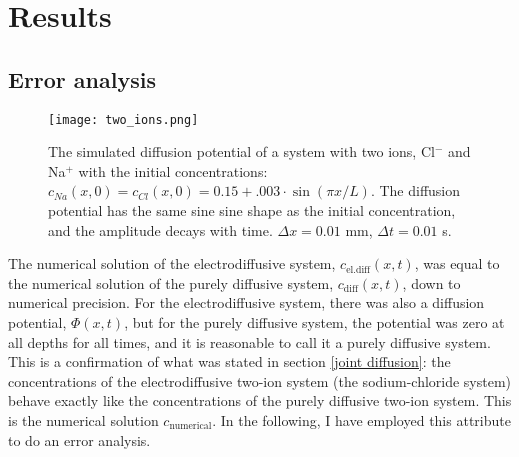 \documentclass{article}
\begin{document}
\section{Results}
\subsection{Error analysis}\label{numerical vs analytical}

\begin{figure}
  \texttt{[image: two\_ions.png]}
  \caption{The simulated diffusion potential of a system with two ions, Cl$^-$ and Na$^+$ with the initial concentrations: $c_{Na}(x,0)=c_{Cl}(x,0)=0.15 + .003\cdot \sin(\pi x/L)$. The diffusion potential has the same sine sine shape as the initial concentration, and the amplitude decays with time. $\Delta x = 0.01$ mm, $\Delta t = 0.01 $ s. }
  \label{fig:two_ions}
\end{figure}

The numerical solution of the electrodiffusive system, $c_{\text{el.diff}}(x,t)$, was equal to the numerical solution of the purely diffusive system, $c_{\text{diff}}(x,t)$, down to numerical precision. For the electrodiffusive system, there was also a diffusion potential, $\Phi(x,t)$, but for the purely diffusive system, the potential was zero at all depths for all times, and it is reasonable to call it a purely diffusive system. This is a confirmation of what was stated in section \ref{joint diffusion}: the concentrations of the electrodiffusive two-ion system (the sodium-chloride system) behave exactly like the concentrations of the purely diffusive two-ion system. This is the numerical solution $c_{\text{numerical}}$. In the following, I have employed this attribute to do an error analysis. 
\end{document}
